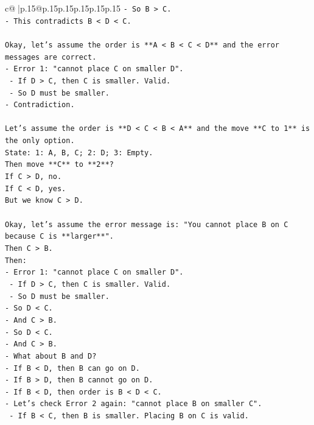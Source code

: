 \documentclass{article}
\begin{document}
{\begin{supertabular}{c@{$\;$}|p{.15\linewidth}@{}p{.15\linewidth}p{.15\linewidth}p{.15\linewidth}p{.15\linewidth}p{.15\linewidth}}
{{{\texttt{{-} So B > C.} \\
\texttt{{-} This contradicts B < D < C.} \\
\\ 
\texttt{Okay, let's assume the order is **A < B < C < D** and the error messages are correct.} \\
\texttt{{-} Error 1: "cannot place C on smaller D".} \\
\texttt{    {-} If D > C, then C is smaller. Valid.} \\
\texttt{    {-} So D must be smaller.} \\
\texttt{{-} Contradiction.} \\
\\ 
\texttt{Let's assume the order is **D < C < B < A** and the move **C to 1** is the only option.} \\
\texttt{State: 1: A, B, C; 2: D; 3: Empty.} \\
\texttt{Then move **C** to **2**?} \\
\texttt{If C > D, no.} \\
\texttt{If C < D, yes.} \\
\texttt{But we know C > D.} \\
\\ 
\texttt{Okay, let's assume the error message is: "You cannot place B on C because C is **larger**".} \\
\texttt{Then C > B.} \\
\texttt{Then:} \\
\texttt{{-} Error 1: "cannot place C on smaller D".} \\
\texttt{    {-} If D > C, then C is smaller. Valid.} \\
\texttt{    {-} So D must be smaller.} \\
\texttt{{-} So D < C.} \\
\texttt{{-} And C > B.} \\
\texttt{{-} So D < C.} \\
\texttt{{-} And C > B.} \\
\texttt{{-} What about B and D?} \\
\texttt{{-} If B < D, then B can go on D.} \\
\texttt{{-} If B > D, then B cannot go on D.} \\
\texttt{{-} If B < D, then order is B < D < C.} \\
\texttt{{-} Let's check Error 2 again: "cannot place B on smaller C".} \\
\texttt{    {-} If B < C, then B is smaller. Placing B on C is valid.} \\
}}}
\end{supertabular}}
\end{document}
